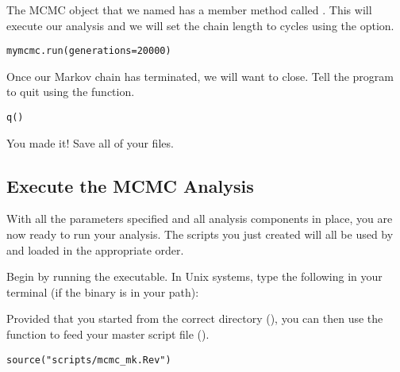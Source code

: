 The MCMC object that we named  has a member method called . 
This will execute our analysis and we will set the chain length to  cycles using the  option.
{\tt \begin{snugshade*}
\begin{lstlisting}
mymcmc.run(generations=20000)
\end{lstlisting}
\end{snugshade*}}

Once our Markov chain has terminated, we will want \RevBayes to close. 
Tell the program to quit using the  function.
{\tt \begin{snugshade*}
\begin{lstlisting}
q()
\end{lstlisting}
\end{snugshade*}}

{\begin{framed}
You made it! Save all of your files.
\end{framed}}

\bigskip
\subsection{Execute the MCMC Analysis}\label{subsect:Exercise-RunMCMC}

With all the parameters specified and all analysis components in place, you are now ready to run your analysis. 
The \Rev scripts you just created will all be used by \RevBayes and loaded in the appropriate order.

{\begin{framed}
Begin by running the \RevBayes executable. In Unix systems, type the following in your terminal (if the \RevBayes binary is in your path):

\colorbox{black}{\strut\hspace{1mm}\textcolor[rgb]{0,1,1}{}\hspace{0.925\textwidth}}
\end{framed}}

Provided that you started \RevBayes from the correct directory (), you can then use the  function to feed \RevBayes your master script file ().
{\tt \begin{snugshade*}
\begin{lstlisting}
source("scripts/mcmc_mk.Rev")
\end{lstlisting}
\end{snugshade*}}

